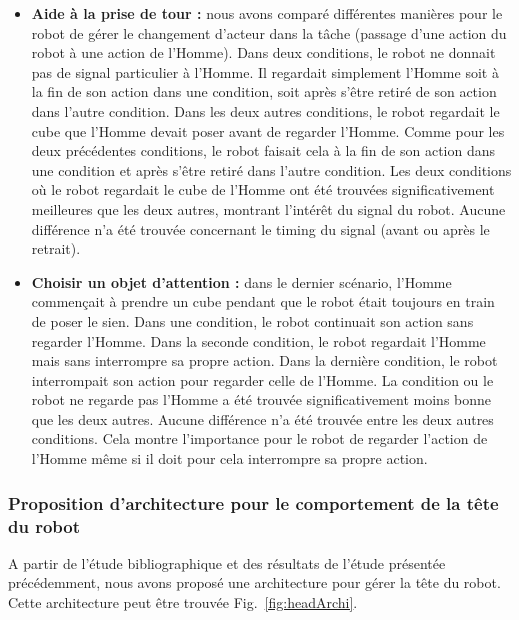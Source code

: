\documentclass[english,a4paper,11pt,twoside]{StyleThese}
\begin{document}
\begin{itemize}
\item \textbf{Aide à la prise de tour :} nous avons comparé différentes manières pour le robot de gérer le changement d'acteur dans la tâche (passage d'une action du robot à une action de l'Homme). Dans deux conditions, le robot ne donnait pas de signal particulier à l'Homme. Il regardait simplement l'Homme soit à la fin de son action dans une condition, soit après s'être retiré de son action dans l'autre condition. Dans les deux autres conditions, le robot regardait le cube que l'Homme devait poser avant de regarder l'Homme. Comme pour les deux précédentes conditions, le robot faisait cela à la fin de son action dans une condition et après s'être retiré dans l'autre condition. Les deux conditions où le robot regardait le cube de l'Homme ont été trouvées significativement meilleures que les deux autres, montrant l’intérêt du signal du robot. Aucune différence n'a été trouvée concernant le timing du signal (avant ou après le retrait).
\item \textbf{Choisir un objet d'attention :} dans le dernier scénario, l'Homme commençait à prendre un cube pendant que le robot était toujours en train de poser le sien. Dans une condition, le robot continuait son action sans regarder l'Homme. Dans la seconde condition, le robot regardait l'Homme mais sans interrompre sa propre action. Dans la dernière condition, le robot interrompait son action pour regarder celle de l'Homme. La condition ou le robot ne regarde pas l'Homme a été trouvée significativement moins bonne que les deux autres. Aucune différence n'a été trouvée entre les deux autres conditions. Cela montre l'importance pour le robot de regarder l'action de l'Homme même si il doit pour cela interrompre sa propre action.
\end{itemize}

\subsubsection{Proposition d'architecture pour le comportement de la tête du robot}

A partir de l'étude bibliographique et des résultats de l'étude présentée précédemment, nous avons proposé une architecture pour gérer la tête du robot. Cette architecture peut être trouvée Fig.~\ref{fig:headArchi}.
\end{document}
